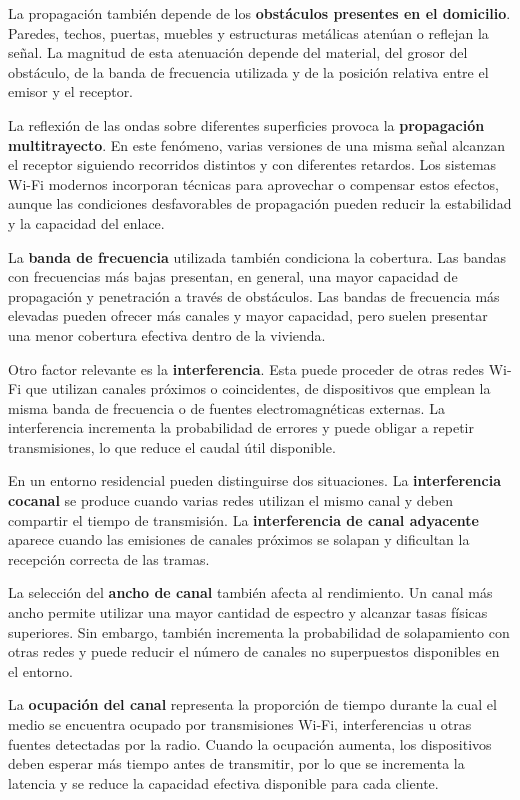 La propagación también depende de los
\textbf{obstáculos presentes en el domicilio}. Paredes, techos, puertas,
muebles y estructuras metálicas atenúan o reflejan la señal. La magnitud
de esta atenuación depende del material, del grosor del obstáculo, de la
banda de frecuencia utilizada y de la posición relativa entre el emisor y
el receptor.

La reflexión de las ondas sobre diferentes superficies provoca la
\textbf{propagación multitrayecto}. En este fenómeno, varias versiones de
una misma señal alcanzan el receptor siguiendo recorridos distintos y
con diferentes retardos. Los sistemas Wi-Fi modernos incorporan técnicas
para aprovechar o compensar estos efectos, aunque las condiciones
desfavorables de propagación pueden reducir la estabilidad y la capacidad
del enlace.

La \textbf{banda de frecuencia} utilizada también condiciona la
cobertura. Las bandas con frecuencias más bajas presentan, en general,
una mayor capacidad de propagación y penetración a través de obstáculos.
Las bandas de frecuencia más elevadas pueden ofrecer más canales y mayor
capacidad, pero suelen presentar una menor cobertura efectiva dentro de
la vivienda.

Otro factor relevante es la \textbf{interferencia}. Esta puede proceder
de otras redes Wi-Fi que utilizan canales próximos o coincidentes, de
dispositivos que emplean la misma banda de frecuencia o de fuentes
electromagnéticas externas. La interferencia incrementa la probabilidad
de errores y puede obligar a repetir transmisiones, lo que reduce el
caudal útil disponible.

En un entorno residencial pueden distinguirse dos situaciones. La
\textbf{interferencia cocanal} se produce cuando varias redes utilizan el
mismo canal y deben compartir el tiempo de transmisión. La
\textbf{interferencia de canal adyacente} aparece cuando las emisiones de
canales próximos se solapan y dificultan la recepción correcta de las
tramas.

La selección del \textbf{ancho de canal} también afecta al rendimiento.
Un canal más ancho permite utilizar una mayor cantidad de espectro y
alcanzar tasas físicas superiores. Sin embargo, también incrementa la
probabilidad de solapamiento con otras redes y puede reducir el número de
canales no superpuestos disponibles en el entorno.

La \textbf{ocupación del canal} representa la proporción de tiempo durante
la cual el medio se encuentra ocupado por transmisiones Wi-Fi,
interferencias u otras fuentes detectadas por la radio. Cuando la
ocupación aumenta, los dispositivos deben esperar más tiempo antes de
transmitir, por lo que se incrementa la latencia y se reduce la capacidad
efectiva disponible para cada cliente.


